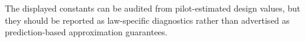 The displayed constants can be audited from pilot-estimated design values, but they should be reported as law-specific diagnostics rather than advertised as prediction-based approximation guarantees.
